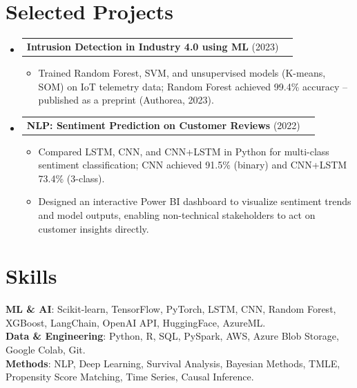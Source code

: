 \documentclass[letterpaper,10.9pt]{article}
\makeatletter
\newcommand{\resumeItem}[1]{
  \item\small{
    {#1 \vspace{-5pt}}
  }
}
\newcommand{\resumeProjectHeading}[2]{
    \item
    \begin{tabular*}{0.97\textwidth}{l@{\extracolsep{\fill}}r}
      \small#1 & #2 \\
    \end{tabular*}\vspace{-7pt}
}
\newcommand{\resumeSubHeadingListStart}{\begin{itemize}[leftmargin=0.15in, label={}]}
\newcommand{\resumeSubHeadingListEnd}{\end{itemize}}
\newcommand{\resumeItemListStart}{\begin{itemize}}
\newcommand{\resumeItemListEnd}{\end{itemize}\vspace{-5pt}}
\makeatother
\begin{document}
\section{Selected Projects}
    \resumeSubHeadingListStart
\resumeProjectHeading
{\textbf{Intrusion Detection in Industry 4.0 using ML} {(2023)}}{}
\resumeItemListStart
  \resumeItem{Trained Random Forest, SVM, and unsupervised models (K-means, SOM) on IoT telemetry data; Random Forest achieved 99.4\% accuracy -- published as a preprint (Authorea, 2023).}
\resumeItemListEnd
\resumeProjectHeading
{\textbf{NLP: Sentiment Prediction on Customer Reviews} {(2022)}}{}
\resumeItemListStart
  \resumeItem{Compared LSTM, CNN, and CNN+LSTM in Python for multi-class sentiment classification; CNN achieved 91.5\% (binary) and CNN+LSTM 73.4\% (3-class).}
  \resumeItem{Designed an interactive Power BI dashboard to visualize sentiment trends and model outputs, enabling non-technical stakeholders to act on customer insights directly.}
\resumeItemListEnd
    \resumeSubHeadingListEnd

\section{Skills}
 \begin{itemize}[leftmargin=0.15in, label={}]
    \small{\item{
    \textbf{ML \& AI}{: Scikit-learn, TensorFlow, PyTorch, LSTM, CNN, Random Forest, XGBoost, LangChain, OpenAI API, HuggingFace, AzureML.}\\
    \textbf{Data \& Engineering}{: Python, R, SQL, PySpark, AWS, Azure Blob Storage, Google Colab, Git.}\\
    \textbf{Methods}{: NLP, Deep Learning, Survival Analysis, Bayesian Methods, TMLE, Propensity Score Matching, Time Series, Causal Inference.}
    }}
 \end{itemize}
\end{document}
